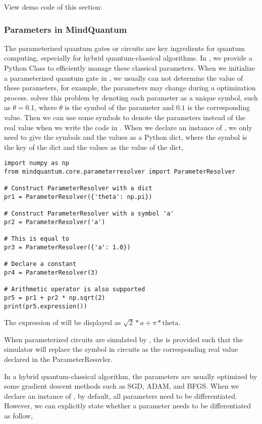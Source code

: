 View demo code of this section: 

\subsubsection{Parameters in MindQuantum}
The parameterized quantum gates or circuits are key ingredients for quantum computing, especially for hybrid quantum-classical algorithms.
In \MindQuantum, we provide a Python Class  to efficiently manage these classical parameters.
When we initialize a parameterized quantum gate in \MindQuantum, we usually can not determine the value of these parameters, for example, the parameters may change during a optimization process.
\ParameterResolver solves this problem by
denoting each parameter as a unique symbol, such as $\theta=0.1$, where $\theta$ is the symbol of the parameter and $0.1$ is the corresponding value.
Then we can use some symbols to denote the parameters instead of the real value when we write the code in \MindQuantum.
When we declare an instance of \ParameterResolver, we only need to give the symbols and the values as a Python dict, where the symbol is the key of the dict and the values as the value of the dict,

\begin{lstlisting}
import numpy as np
from mindquantum.core.parameterresolver import ParameterResolver

# Construct ParameterResolver with a dict
pr1 = ParameterResolver({'theta': np.pi})

# Construct ParameterResolver with a symbol 'a'
pr2 = ParameterResolver('a')

# This is equal to
pr3 = ParameterResolver({'a': 1.0})

# Declare a constant
pr4 = ParameterResolver(3)

# Arithmetic operator is also supported
pr5 = pr1 + pr2 * np.sqrt(2)
print(pr5.expression())
\end{lstlisting}

The expression of  will be displayed as $\sqrt{2}*a + \pi*\text{theta}$.

When parameterized circuits are simulated by \MindQuantum, the \ParameterResolver is provided such that the simulator will replace the symbol in circuits as the corresponding real value declared in the ParameterResovler.

In a hybrid quantum-classical algorithm, the parameters are usually optimized by some gradient descent methods such as SGD, ADAM, and BFGS. When we declare an instance of \ParameterResolver, by default, all parameters need to be differentiated.
However, we can explicitly state whether a parameter needs to be differentiated as follow,

